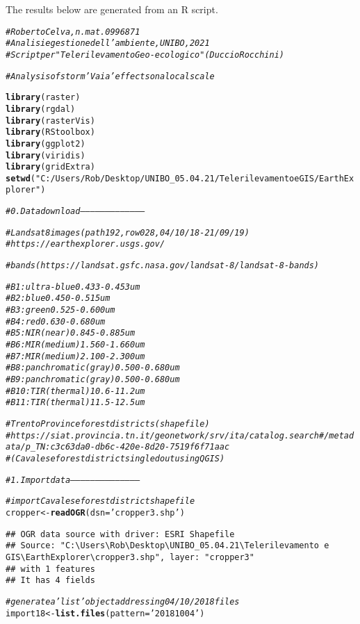 \documentclass{article}\usepackage[]{graphicx}\usepackage[]{color}
\makeatletter
\newcommand{\hlstr}[1]{\textcolor[rgb]{0.192,0.494,0.8}{#1}}%
\newcommand{\hlcom}[1]{\textcolor[rgb]{0.678,0.584,0.686}{\textit{#1}}}%
\newcommand{\hlstd}[1]{\textcolor[rgb]{0.345,0.345,0.345}{#1}}%
\newcommand{\hlkwb}[1]{\textcolor[rgb]{0.69,0.353,0.396}{#1}}%
\newcommand{\hlkwc}[1]{\textcolor[rgb]{0.333,0.667,0.333}{#1}}%
\newcommand{\hlkwd}[1]{\textcolor[rgb]{0.737,0.353,0.396}{\textbf{#1}}}%
\newenvironment{kframe}{%
 \def\at@end@of@kframe{}%
 \ifinner\ifhmode%
  \def\at@end@of@kframe{\end{minipage}}%
  \begin{minipage}{\columnwidth}%
 \fi\fi%
 \def\FrameCommand##1{\hskip\@totalleftmargin \hskip-\fboxsep
 \colorbox{shadecolor}{##1}\hskip-\fboxsep
     \hskip-\linewidth \hskip-\@totalleftmargin \hskip\columnwidth}%
 \MakeFramed {\advance\hsize-\width
   \@totalleftmargin\z@ \linewidth\hsize
   \@setminipage}}%
 {\par\unskip\endMakeFramed%
 \at@end@of@kframe}
\newenvironment{knitrout}{}{} %
\makeatother
\begin{document}
\title{}



\maketitle
The results below are generated from an R script.

\begin{knitrout}
\color{fgcolor}\begin{kframe}
\begin{alltt}
\hlcom{# Roberto Celva, n. mat. 0996871}
\hlcom{# Analisi e gestione dell'ambiente, UNIBO, 2021}
\hlcom{# Script per "Telerilevamento Geo-ecologico" (Duccio Rocchini)}

\hlcom{# Analysis of storm 'Vaia' effects on a local scale}

\hlkwd{library}\hlstd{(raster)}
\hlkwd{library}\hlstd{(rgdal)}
\hlkwd{library}\hlstd{(rasterVis)}
\hlkwd{library}\hlstd{(RStoolbox)}
\hlkwd{library}\hlstd{(ggplot2)}
\hlkwd{library}\hlstd{(viridis)}
\hlkwd{library}\hlstd{(gridExtra)}
\hlkwd{setwd}\hlstd{(}\hlstr{"C:/Users/Rob/Desktop/UNIBO_05.04.21/Telerilevamento e GIS/EarthExplorer"}\hlstd{)}

\hlcom{# 0. Data download ---------------------------------------}

\hlcom{# Landsat8 images (path 192, row 028, 04/10/18 - 21/09/19)}
\hlcom{# https://earthexplorer.usgs.gov/}

\hlcom{# bands (https://landsat.gsfc.nasa.gov/landsat-8/landsat-8-bands)}

\hlcom{# B1: ultra - blue 0.433-0.453 um}
\hlcom{# B2: blue 0.450-0.515 um}
\hlcom{# B3: green 0.525-0.600 um}
\hlcom{# B4: red 0.630-0.680 um}
\hlcom{# B5: NIR (near) 0.845-0.885 um}
\hlcom{# B6: MIR (medium) 1.560-1.660 um}
\hlcom{# B7: MIR (medium) 2.100-2.300 um}
\hlcom{# B8: panchromatic (gray) 0.500-0.680 um}
\hlcom{# B9: panchromatic (gray) 0.500-0.680 um}
\hlcom{# B10: TIR (thermal) 10.6-11.2 um}
\hlcom{# B11: TIR (thermal) 11.5-12.5 um}

\hlcom{# Trento Province forest districts (shapefile)}
\hlcom{# https://siat.provincia.tn.it/geonetwork/srv/ita/catalog.search#/metadata/p_TN:c3c63da0-db6c-420e-8d20-7519f6f71aac}
\hlcom{# (Cavalese forest district singled out using QGIS)}

\hlcom{# 1. Import data ------------------------------------------}

\hlcom{# import Cavalese forest district shapefile}
\hlstd{cropper} \hlkwb{<-} \hlkwd{readOGR}\hlstd{(}\hlkwc{dsn} \hlstd{=} \hlstr{'cropper3.shp'}\hlstd{)}
\end{alltt}
\begin{verbatim}
## OGR data source with driver: ESRI Shapefile 
## Source: "C:\Users\Rob\Desktop\UNIBO_05.04.21\Telerilevamento e GIS\EarthExplorer\cropper3.shp", layer: "cropper3"
## with 1 features
## It has 4 fields
\end{verbatim}
\begin{alltt}
\hlcom{# generate a 'list' object addressing 04/10/2018 files}
\hlstd{import18} \hlkwb{<-} \hlkwd{list.files}\hlstd{(}\hlkwc{pattern} \hlstd{=} \hlstr{'20181004'}\hlstd{)}


\end{alltt}
\end{kframe}
\end{knitrout}
\end{document}
